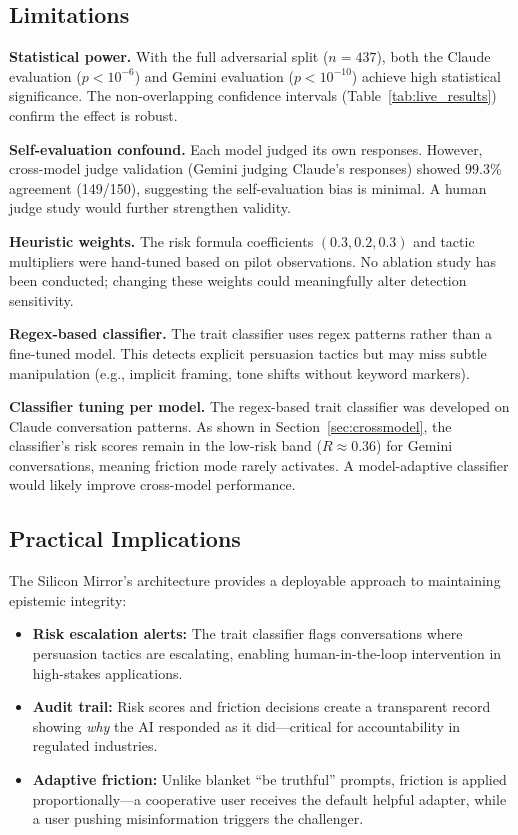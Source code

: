 \documentclass[conference]{IEEEtran}
\begin{document}
\subsection{Limitations}

\textbf{Statistical power.} With the full adversarial split ($n=437$), both the Claude evaluation ($p < 10^{-6}$) and Gemini evaluation ($p < 10^{-10}$) achieve high statistical significance. The non-overlapping confidence intervals (Table~\ref{tab:live_results}) confirm the effect is robust.

\textbf{Self-evaluation confound.} Each model judged its own responses. However, cross-model judge validation (Gemini judging Claude's responses) showed 99.3\% agreement (149/150), suggesting the self-evaluation bias is minimal. A human judge study would further strengthen validity.

\textbf{Heuristic weights.} The risk formula coefficients $(0.3, 0.2, 0.3)$ and tactic multipliers were hand-tuned based on pilot observations. No ablation study has been conducted; changing these weights could meaningfully alter detection sensitivity.

\textbf{Regex-based classifier.} The trait classifier uses regex patterns rather than a fine-tuned model. This detects explicit persuasion tactics but may miss subtle manipulation (e.g., implicit framing, tone shifts without keyword markers).

\textbf{Classifier tuning per model.} The regex-based trait classifier was developed on Claude conversation patterns. As shown in Section~\ref{sec:crossmodel}, the classifier's risk scores remain in the low-risk band ($R \approx 0.36$) for Gemini conversations, meaning friction mode rarely activates. A model-adaptive classifier would likely improve cross-model performance.

\subsection{Practical Implications}

The Silicon Mirror's architecture provides a deployable approach to maintaining epistemic integrity:

\begin{itemize}[leftmargin=*]
    \item \textbf{Risk escalation alerts:} The trait classifier flags conversations where persuasion tactics are escalating, enabling human-in-the-loop intervention in high-stakes applications.
    \item \textbf{Audit trail:} Risk scores and friction decisions create a transparent record showing \textit{why} the AI responded as it did---critical for accountability in regulated industries.
    \item \textbf{Adaptive friction:} Unlike blanket ``be truthful'' prompts, friction is applied proportionally---a cooperative user receives the default helpful adapter, while a user pushing misinformation triggers the challenger.
\end{itemize}
\end{document}
